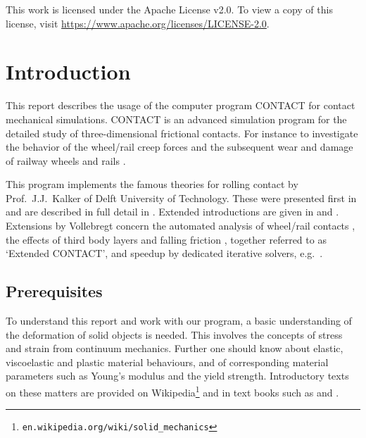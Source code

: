 \documentclass[12pt]{report}
\begin{document}
This work is licensed under the Apache License v2.0. To view a copy of this
license, visit
\href{https://www.apache.org/licenses/LICENSE-2.0}{https://\-www.apache.org/licenses/LICENSE-2.0}.


\clearpage


\chapter{Introduction}
\label{chp:introduction}

This report describes the usage of the computer program CONTACT for contact
mechanical simulations. CONTACT is an advanced simulation program for the
detailed study of three-dimensional frictional contacts. For instance to
investigate the behavior of the wheel/rail creep forces and the subsequent
wear and damage of railway wheels and rails \cite{Meymand2016a-review,
Vollebregt2021a-soa-paper}.

This program implements the famous theories for rolling contact by Prof.\
J.J.\ Kalker of Delft University of Technology. These were presented first
in \cite{Kalker1979a} and are described in full detail in
\cite{Kalker1990}. Extended introductions are given in \cite{Kalker2000}
and \cite{Vollebregt2011a-assessm}. Extensions by Vollebregt concern the
automated analysis of wheel/rail contacts \cite{Vollebregt2020b-wrgeom,
Vollebregt2020c-distr-force,Vollebregt2022b-cm2022,
Vollebregt2023a-iavsd2023}, the effects of third
body layers \cite{Vollebregt2014c-tractcurv,Vollebregt2019a-fra} and
falling friction \cite{Vollebregt2012a-quasistd}, together referred to as
`Extended CONTACT', and speedup by dedicated iterative solvers, e.g.\
\cite{Vollebregt2014a-fftprec,Zhao_Jing2015a-tangcg}.

\section{Prerequisites}

To understand this report and work with our program, a basic understanding
of the deformation of solid objects is needed. This involves the concepts
of stress and strain from continuum mechanics. Further one should know
about elastic, viscoelastic and plastic material behaviours, and of
corresponding material parameters such as Young's modulus and the yield
strength. Introductory texts on these matters are provided on
Wikipedia\footnote{{\tt en.wikipedia.org/wiki/solid\_mechanics}} and in
text books such as \cite{Bower2008} and \cite{Naghdi2001}.
\end{document}
